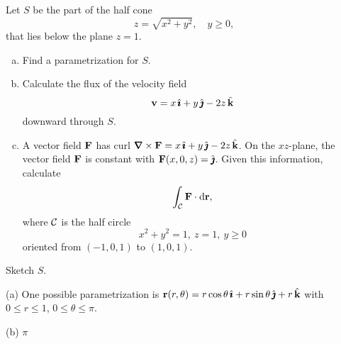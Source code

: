 \begin{question}[M317 2018A] %
Let $S$ be the part of the half cone 
\begin{equation*}
z=\sqrt{x^2+y^2},\quad  y\ge 0,
\end{equation*}
that lies below the plane $z=1$.
\begin{enumerate}[(a)]
\item
Find a parametrization for $S$.
\item
Calculate the flux of the velocity field
\begin{equation*}
\mathbf{v}=x\,\hat{\pmb{\imath}} + y\, \hat{\pmb{\jmath}} -2 z\,\hat{\mathbf{k}}
\end{equation*}
downward through $S$.

\item
A vector field $\mathbf{F}$ has curl $\vnabla\times \vF= x\, \hi + y\, \hj -2 z\,\hk$. 
On the $xz$-plane, the vector field $\mathbf{F}$ is constant with $\mathbf{F}(x,0,z)=\hat{\pmb{\jmath}}$. Given this information, calculate
\begin{equation*}
\int_{\mathcal{C}} \mathbf{F}\cdot \mathrm{d}\mathbf{r},
\end{equation*}
where $\mathcal{C}$ is the half circle
\begin{equation*}
x^2+y^2=1,\ z=1,\ y\ge 0
\end{equation*}
oriented from $(-1,0,1)$ to $(1,0,1)$.
\end{enumerate}
\end{question}

\begin{hint} 
Sketch $S$.
\end{hint}

\begin{answer} 
(a) One possible parametrization is 
$\mathbf{r}(r, \theta) = r\cos \theta\, \hat{\pmb{\imath}} +r\sin \theta\, \hat{\pmb{\jmath}} + r\,\hat{\mathbf{k}}$
with $0\le r\le 1$, $0\le \theta \le \pi$.

(b) $\pi$\qquad
\end{answer}

